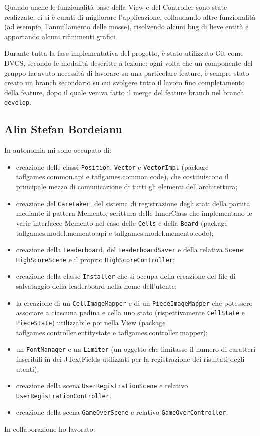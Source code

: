 \documentclass[a4paper,12pt]{report}
\begin{document}
Quando anche le funzionalità base della View e del Controller sono state realizzate, ci si è curati di migliorare l'applicazione, collaudando altre funzionalità (ad esempio, l'annullamento delle mosse), risolvendo alcuni bug di lieve entità e apportando alcuni rifinimenti grafici.

Durante tutta la fase implementativa del progetto, è stato utilizzato Git come DVCS, secondo le modalità descritte a lezione: ogni volta che un componente del gruppo ha avuto necessità di lavorare su una particolare feature, è sempre stato creato un branch secondario su cui svolgere tutto il lavoro fino completamento della feature, dopo il quale veniva fatto il merge del feature branch nel branch \texttt{develop}. 

\subsection{Alin Stefan Bordeianu}
In autonomia mi sono occupato di:
\begin{itemize}
	\item creazione delle classi \texttt{Position}, \texttt{Vector} e \texttt{VectorImpl} (package taflgames.common.api e taflgames.common.code), che costituiscono il principale mezzo di comunicazione di tutti gli elementi dell'architettura;
	
	\item creazione del \texttt{Caretaker}, del sistema di registrazione degli stati della partita mediante il pattern Memento, scrittura delle InnerClass che implementano le varie interfacce Memento nel caso delle \texttt{Cells} e della \texttt{Board} (package taflgames.model.memento.api e taflgames.model.memento.code);
	
	\item creazione della \texttt{Leaderboard}, del \texttt{LeaderboardSaver} e della relativa \texttt{Scene}: \texttt{HighScoreScene} e il proprio \texttt{HighScoreController};

	\item creazione della classe \texttt{Installer} che si occupa della creazione del file di salvataggio della leaderboard nella home dell'utente;
	
	\item la creazione di un \texttt{CellImageMapper} e di un \texttt{PieceImageMapper} che potessero associare a ciascuna pedina e cella uno stato (rispettivamente \texttt{CellState} e \texttt{PieceState}) utilizzabile poi nella View (package taflgames.controller.entitystate e taflgames.controller.mapper);
	
	\item un \texttt{FontManager} e un \texttt{Limiter} (un oggetto che limitasse il numero di caratteri inseribili in dei JTextFields utilizzati per la registrazione dei risultati degli utenti);
	
	\item creazione della scena \texttt{UserRegistrationScene} e relativo \texttt{UserRegistrationController}.
	
	\item creazione della scena \texttt{GameOverScene} e relativo \texttt{GameOverController}.
\end{itemize}
In collaborazione ho lavorato:
\end{document}
